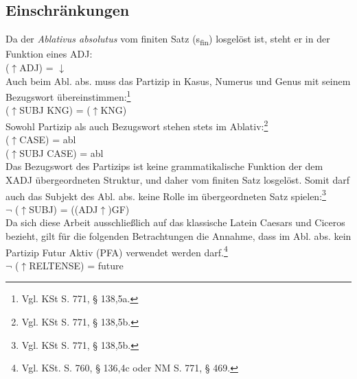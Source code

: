 \documentclass[12pt,a4paper]{article}
\begin{document}
\subsection{Einschränkungen}
Da der \textit{Ablativus absolutus} vom finiten Satz (s\textsubscript{fin}) losgelöst ist, steht er in der Funktion eines ADJ: \\
($\uparrow$ADJ) = $\downarrow$ \\
Auch beim Abl. abs. muss das Partizip in Kasus, Numerus und Genus mit seinem Bezugswort übereinstimmen:\footnote{Vgl. KSt S. 771, § 138,5a.}\\
($\uparrow$SUBJ KNG) = ($\uparrow$KNG)\\
Sowohl Partizip als auch Bezugswort stehen stets im Ablativ:\footnote{Vgl. KSt S. 771, § 138,5b.} \\
($\uparrow$CASE) = abl \\
($\uparrow$SUBJ CASE) = abl \\
Das Bezugswort des Partizips ist keine grammatikalische Funktion der dem XADJ übergeordneten Struktur, und daher vom finiten Satz losgelöst. Somit darf auch das Subjekt des Abl. abs. keine Rolle im übergeordneten Satz spielen:\footnote{Vgl. KSt S. 771, § 138,5b.} \\
$\neg$ ($\uparrow$SUBJ) = ((ADJ$\uparrow$)GF) \\
Da sich diese Arbeit ausschließlich auf das klassische Latein Caesars und Ciceros bezieht, gilt für die folgenden Betrachtungen die Annahme, dass im Abl. abs. kein Partizip Futur Aktiv (PFA) verwendet werden darf.\footnote{Vgl. KSt. S. 760, § 136,4c oder NM S. 771, § 469.}\\
$\neg$ ($\uparrow$RELTENSE) = future \\

\end{document}
